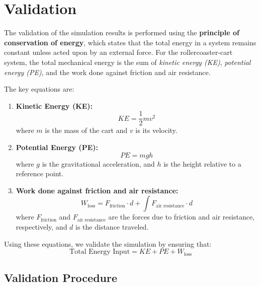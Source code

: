 \documentclass{article}
\begin{document}
    \section{Validation}
    The validation of the simulation results is performed using the \textbf{principle
    of conservation of energy}, which states that the total energy in a system
    remains constant unless acted upon by an external force. For the rollercoaster-cart
    system, the total mechanical energy is the sum of \textit{kinetic energy (KE)},
    \textit{potential energy (PE)}, and the work done against friction and air
    resistance.

    The key equations are:

    \begin{enumerate}
        \item \textbf{Kinetic Energy (KE):}
            \begin{equation}
                KE = \frac{1}{2}m v^{2}
            \end{equation}
            where $m$ is the mass of the cart and $v$ is its velocity.

        \item \textbf{Potential Energy (PE):}
            \begin{equation}
                PE = m g h
            \end{equation}
            where $g$ is the gravitational acceleration, and $h$ is the height relative
            to a reference point.

        \item \textbf{Work done against friction and air resistance:}
            \begin{equation}
                W_{\text{loss}}= F_{\text{friction}}\cdot d +\int F_{\text{air
                resistance}}\cdot d
            \end{equation}
            where $F_{\text{friction}}$ and $F_{\text{air resistance}}$ are the
            forces due to friction and air resistance, respectively, and $d$ is
            the distance traveled.
    \end{enumerate}

    Using these equations, we validate the simulation by ensuring that:
    \begin{equation}
        \text{Total Energy Input}= KE + PE + W_{\text{loss}}
    \end{equation}

    \subsection{Validation Procedure}
\end{document}
